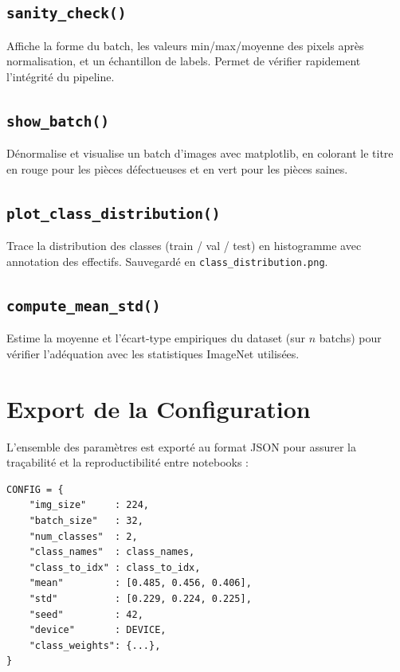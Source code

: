\subsection{\texttt{sanity\_check()}}

Affiche la forme du batch, les valeurs min/max/moyenne des pixels après normalisation, et un échantillon de labels. Permet de vérifier rapidement l'intégrité du pipeline.

\subsection{\texttt{show\_batch()}}

Dénormalise et visualise un batch d'images avec matplotlib, en colorant le titre en \textcolor{defect}{rouge} pour les pièces défectueuses et en \textcolor{ok}{vert} pour les pièces saines.

\subsection{\texttt{plot\_class\_distribution()}}

Trace la distribution des classes (train / val / test) en histogramme avec annotation des effectifs. Sauvegardé en \texttt{class\_distribution.png}.

\subsection{\texttt{compute\_mean\_std()}}

Estime la moyenne et l'écart-type empiriques du dataset (sur $n$ batchs) pour vérifier l'adéquation avec les statistiques ImageNet utilisées.

\section{Export de la Configuration}

L'ensemble des paramètres est exporté au format JSON pour assurer la traçabilité et la reproductibilité entre notebooks :

\begin{lstlisting}[caption={Dictionnaire de configuration exporté}]
CONFIG = {
    "img_size"     : 224,
    "batch_size"   : 32,
    "num_classes"  : 2,
    "class_names"  : class_names,
    "class_to_idx" : class_to_idx,
    "mean"         : [0.485, 0.456, 0.406],
    "std"          : [0.229, 0.224, 0.225],
    "seed"         : 42,
    "device"       : DEVICE,
    "class_weights": {...},
}
\end{lstlisting}


